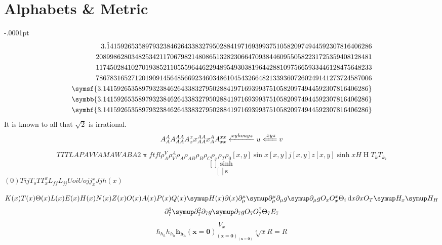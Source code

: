 \documentclass[11pt,fleqn]{article}
\newcommand{\dd}{\,\mathrm{d}}
\begin{document}
\section{Alphabets \& Metric}
\delimitershortfall-.0001pt
\[\begin{split}
  3.\hat 141592653589793238462643383279502884197169399375105820974944592307816406286\\
  208998628034825342117067982148086513282306647093844609550582231725359408128481\\ 117450284102701938521105559644622948954930381964428810975665933446128475648233\\ 786783165271201909145648566923460348610454326648213393607260249141273724587006\\
  \symsf{3.141592653589793238462643383279502884197169399375105820974944592307816406286}\\
  \symbb{3.141592653589793238462643383279502884197169399375105820974944592307816406286}\\
  \symbf{3.141592653589793238462643383279502884197169399375105820974944592307816406286}\\
\end{split}\]
It is known to all that $\sqrt 2$ is irrational.
\[A_A^AA_{AA}^{AA}A_x^x x_{AA}^{AA} x_A^A A_{xx}^{xx}\xleftarrow{xyhougz}u\xLeftarrow{xyz}v\]
\[TT{}TLAPAVVAMAWABA2\uppi ft fl\rho_A^V\rho_V^A\rho_{A{}}\rho_{AB}\rho_B\rho_C\rho_x\rho_{T{}}\rho_0[x,y]\sin x[x,y]j[x,y]z[x,y]\sinh xH\upEta T_kT_{k_k}\]
\[[]\sinh\]
\[[]\mathrm s\]
$(0) T{ijT_oTT_x^xL_{ff}L_{jj}Uo}iUojj_x^xJjh(x)$

$K(x)T(x)\Theta(x)L(x)E(x)H(x)N(x)Z(x)O(x)A(x)P(x)Q(x)\symup H(x)\partial(x)\partial_\mu^\mu\symup\partial_\mu^\mu\partial_\mu g\symup\partial_\mu g O_xO_x^x\Theta_{i}\dd  x \partial x O_T\symup H_x\symup H_H$
\[\partial_7^2\symup\partial_7^2\partial_7 g\symup\partial_7 g O_7O_7^7\Theta_{7}E_7\]
\[V_{x}\]
\[\hbar_{\hbar_\hbar} h_{h_h}\symbf{h_{h_h}(x=0)_{(x=0)_{(x=0)}}}\sqrt[3]{x}R=R\]
\end{document}
